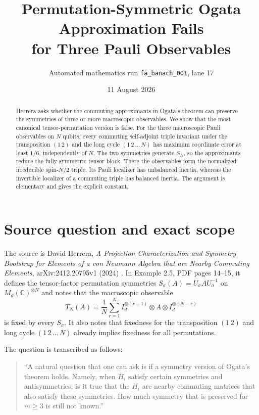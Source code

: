 \documentclass[11pt]{article}
\title{Permutation-Symmetric Ogata Approximation Fails\\for Three Pauli Observables}
\author{Automated mathematics run \texttt{fa\_banach\_001}, lane 17}
\date{11 August 2026}
\newcommand{\C}{\mathbb C}
\begin{document}
\maketitle

\begin{center}
\end{center}

\begin{abstract}
Herrera asks whether the commuting approximants in Ogata's theorem can
preserve the symmetries of three or more macroscopic observables.  We show
that the most canonical tensor-permutation version is false.  For the three
macroscopic Pauli observables on $N$ qubits, every commuting self-adjoint
triple invariant under the transposition $(1\,2)$ and the long cycle
$(1\,2\,\ldots\,N)$ has maximum coordinate error at least $1/6$, independently
of $N$.  The two symmetries generate $S_N$, so the approximants reduce the
fully symmetric tensor block.  There the observables form the normalized
irreducible spin-$N/2$ triple.  Its Pauli localizer has unbalanced inertia,
whereas the invertible localizer of a commuting triple has balanced inertia.
The argument is elementary and gives the explicit constant.
\end{abstract}

\section{Source question and exact scope}

The source is David Herrera, \emph{A Projection Characterization and Symmetry
Bootstrap for Elements of a von Neumann Algebra that are Nearby Commuting
Elements}, arXiv:2412.20795v1 (2024) \cite{Herrera2024}.  In Example 2.5,
PDF pages 14--15, it defines the tensor-factor permutation symmetries
$S_\sigma(A)=U_\sigma A U_\sigma^{-1}$ on $M_d(\C)^{\otimes N}$ and notes that
the macroscopic observable
\[
 T_N(A)=\frac1N\sum_{r=1}^N
 I_d^{\otimes(r-1)}\otimes A\otimes I_d^{\otimes(N-r)}
\]
is fixed by every $S_\sigma$.  It also notes that fixedness for the
transposition $(1\,2)$ and long cycle $(1\,2\,\ldots\,N)$ already implies
fixedness for all permutations.

The question is transcribed as follows:
\begin{quote}
``A natural question that one can ask is if a symmetry version of Ogata's
theorem holds. Namely, when $H_i$ satisfy certain symmetries and
antisymmetries, is it true that the $H_i$ are nearby commuting matrices that
also satisfy these symmetries. How much symmetry that is preserved for
$m\ge 3$ is still not known.''
\end{quote}
\end{document}
